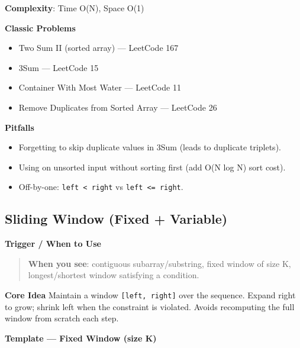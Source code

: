 \documentclass[11pt]{article}
\providecommand{\tightlist}{\setlength{\itemsep}{1pt}\setlength{\parskip}{0pt}}
\begin{document}
\textbf{Complexity}: Time O(N), Space O(1)

\textbf{Classic Problems}

\begin{itemize}
\tightlist
\item
  Two Sum II (sorted array) --- LeetCode 167
\item
  3Sum --- LeetCode 15
\item
  Container With Most Water --- LeetCode 11
\item
  Remove Duplicates from Sorted Array --- LeetCode 26
\end{itemize}

\textbf{Pitfalls}

\begin{itemize}
\tightlist
\item
  Forgetting to skip duplicate values in 3Sum (leads to duplicate triplets).
\item
  Using on unsorted input without sorting first (add O(N log N) sort cost).
\item
  Off-by-one: \texttt{left\ \textless{}\ right} vs \texttt{left\ \textless{}=\ right}.
\end{itemize}

\subsection{Sliding Window (Fixed + Variable)}\label{sliding-window-fixed--variable}


\textbf{Trigger / When to Use}

\begin{quote}
\textbf{When you see}: contiguous subarray/substring, fixed window of size K, longest/shortest window satisfying a condition.
\end{quote}

\textbf{Core Idea}
Maintain a window \texttt{{[}left,\ right{]}} over the sequence. Expand right to grow; shrink left when the constraint is violated. Avoids recomputing the full window from scratch each step.

\textbf{Template --- Fixed Window (size K)}

\end{document}
